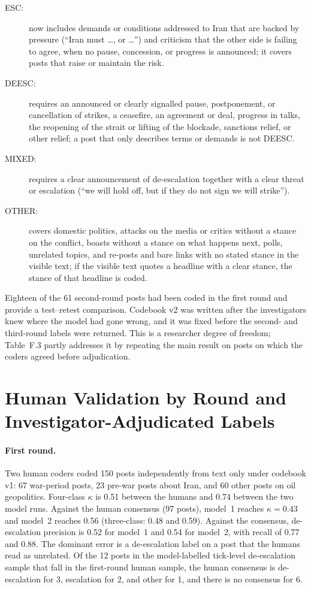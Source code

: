 \documentclass[11pt]{article}
\begin{document}
\begin{description}
\item[ESC:] now includes demands or conditions addressed to Iran that are backed by pressure (``Iran must \ldots, or \ldots'') and criticism that the other side is failing to agree, when no pause, concession, or progress is announced; it covers posts that raise or maintain the risk.
\item[DEESC:] requires an announced or clearly signalled pause, postponement, or cancellation of strikes, a ceasefire, an agreement or deal, progress in talks, the reopening of the strait or lifting of the blockade, sanctions relief, or other relief; a post that only describes terms or demands is not DEESC.
\item[MIXED:] requires a clear announcement of de-escalation together with a clear threat or escalation (``we will hold off, but if they do not sign we will strike'').
\item[OTHER:] covers domestic politics, attacks on the media or critics without a stance on the conflict, boasts without a stance on what happens next, polls, unrelated topics, and re-posts and bare links with no stated stance in the visible text; if the visible text quotes a headline with a clear stance, the stance of that headline is coded.
\end{description}

\noindent Eighteen of the 61 second-round posts had been coded in the first round and provide a test--retest comparison. Codebook v2 was written after the investigators knew where the model had gone wrong, and it was fixed before the second- and third-round labels were returned. This is a researcher degree of freedom; Table~F.3 partly addresses it by repeating the main result on posts on which the coders agreed before adjudication.

\section{Human Validation by Round and Investigator-Adjudicated Labels}
\label{sec:validation}

\paragraph{First round.} Two human coders coded 150 posts independently from text only under codebook v1: 67 war-period posts, 23 pre-war posts about Iran, and 60 other posts on oil geopolitics. Four-class $\kappa$ is 0.51 between the humans and 0.74 between the two model runs. Against the human consensus (97 posts), model~1 reaches $\kappa = 0.43$ and model~2 reaches 0.56 (three-class: 0.48 and 0.59). Against the consensus, de-escalation precision is 0.52 for model~1 and 0.54 for model~2, with recall of 0.77 and 0.88. The dominant error is a de-escalation label on a post that the humans read as unrelated. Of the 12 posts in the model-labelled tick-level de-escalation sample that fall in the first-round human sample, the human consensus is de-escalation for 3, escalation for 2, and other for 1, and there is no consensus for 6.
\end{document}
